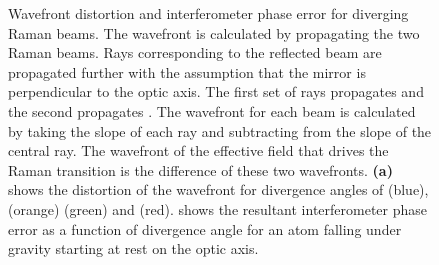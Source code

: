 \begin{figure}[!htbp]
	\centering
	\def\svgwidth{\columnwidth}
	\caption[Wavefront distortion and interferometer phase error for
  diverging Raman beams.]{Wavefront distortion and interferometer phase error for
  diverging Raman beams. The wavefront is calculated by propagating
  the two Raman beams. Rays corresponding to the reflected beam are propagated further with the assumption that the mirror is perpendicular to the optic axis. The first
		set of rays propagates  and the second propagates
		. The wavefront for each beam is calculated by
		taking the slope of each ray and subtracting from the slope of the central
		ray. The wavefront of the effective field that drives the Raman transition
    is the difference of these two wavefronts. \textbf{(a)} shows the distortion of the
		wavefront for divergence angles of
		 (blue),  (orange)
		 (green) and
     (red).  shows the resultant
    interferometer phase error as a function of divergence angle for an atom falling under gravity
    starting at rest on the optic axis.  
		}\label{fig:collimation_error_plots}
\end{figure}
\par\noindent
